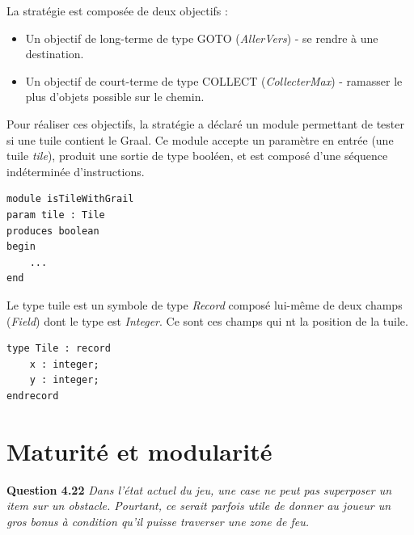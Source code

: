 \documentclass[oneside,a4paper]{book}
\begin{document}
La stratégie est composée de deux objectifs : 
\begin{itemize}
    \item Un objectif de long-terme de type GOTO (\textit{AllerVers}) - se rendre à une destination.
    \item Un objectif de court-terme de type COLLECT (\textit{CollecterMax}) - ramasser le plus d'objets possible sur le chemin.
\end{itemize}


Pour réaliser ces objectifs, la stratégie a déclaré un module permettant de tester si une tuile contient le Graal.  Ce module accepte un paramètre en entrée (une tuile \textit{tile}), produit une sortie de type booléen, et est composé d'une séquence indéterminée d'instructions.
    \begin{lstlisting}
module isTileWithGrail
param tile : Tile
produces boolean
begin
    ...
end
    \end{lstlisting}

Le type tuile est un symbole de type \textit{Record} composé lui-même de deux champs (\textit{Field}) dont le type est \textit{Integer}. Ce sont ces champs qui nt la position de la tuile.
    \begin{lstlisting}
type Tile : record
    x : integer;
    y : integer;
endrecord
    \end{lstlisting}

\chapter{Maturité et modularité}

\textbf{Question 4.22}\label{Question 4.22.}\newline
\textit{Dans l'état actuel du jeu, une case ne peut pas superposer un item sur un obstacle. Pourtant, ce serait parfois utile de donner au joueur un gros bonus à condition qu'il puisse traverser une zone de feu.}
\end{document}
